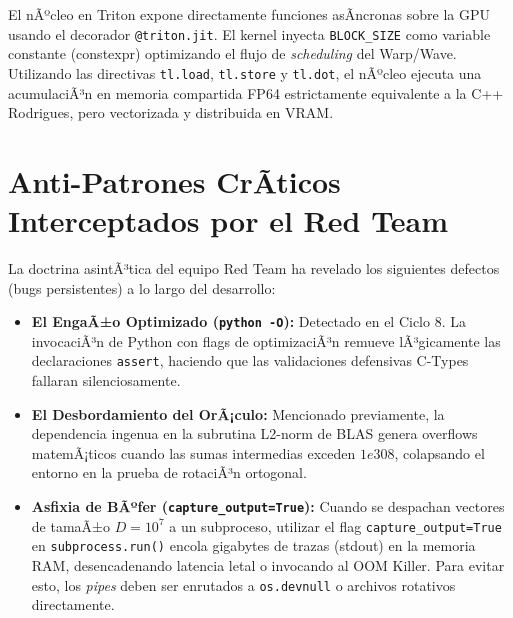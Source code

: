 El nÃºcleo en Triton expone directamente funciones asÃ­ncronas sobre la GPU usando el decorador \texttt{@triton.jit}. El kernel inyecta \texttt{BLOCK\_SIZE} como variable constante (constexpr) optimizando el flujo de \textit{scheduling} del Warp/Wave. Utilizando las directivas \texttt{tl.load}, \texttt{tl.store} y \texttt{tl.dot}, el nÃºcleo ejecuta una acumulaciÃ³n en memoria compartida FP64 estrictamente equivalente a la C++ Rodrigues, pero vectorizada y distribuida en VRAM.

\section{Anti-Patrones CrÃ­ticos Interceptados por el Red Team}


La doctrina asintÃ³tica del equipo Red Team ha revelado los siguientes defectos (bugs persistentes) a lo largo del desarrollo:
\begin{itemize}
    \item \textbf{El EngaÃ±o Optimizado (\texttt{python -O}):} Detectado en el Ciclo 8. La invocaciÃ³n de Python con flags de optimizaciÃ³n remueve lÃ³gicamente las declaraciones \texttt{assert}, haciendo que las validaciones defensivas C-Types fallaran silenciosamente. 
    \item \textbf{El Desbordamiento del OrÃ¡culo:} Mencionado previamente, la dependencia ingenua en la subrutina L2-norm de BLAS genera overflows matemÃ¡ticos cuando las sumas intermedias exceden \(1e308\), colapsando el entorno en la prueba de rotaciÃ³n ortogonal.
    \item \textbf{Asfixia de BÃºfer (\texttt{capture\_output=True}):} Cuando se despachan vectores de tamaÃ±o \(D=10^7\) a un subproceso, utilizar el flag \texttt{capture\_output=True} en \texttt{subprocess.run()} encola gigabytes de trazas (stdout) en la memoria RAM, desencadenando latencia letal o invocando al OOM Killer. Para evitar esto, los \textit{pipes} deben ser enrutados a \texttt{os.devnull} o archivos rotativos directamente.
\end{itemize}